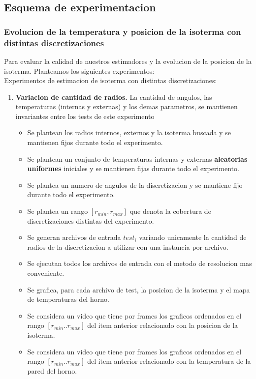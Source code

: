 \subsection{Esquema de experimentacion}
\subsubsection{Evolucion de la temperatura y posicion de la isoterma con distintas discretizaciones}
Para evaluar la calidad de nuestros estimadores y la evolucion de la posicion de la isoterma. Planteamos los siguientes experimentos:\\
Experimentos de estimacion de isoterma con distintas discretizaciones:
\begin{enumerate}
    \item \textbf{Variacion de cantidad de radios.} La cantidad de angulos, las temperaturas (internas y externas) y los demas parametros, se mantienen invariantes entre los tests de este experimento\begin{itemize}
        \item Se plantean los radios internos, externos y la isoterma buscada y se mantienen fijos durante todo el experimento.
        \item Se plantean un conjunto de temperaturas internas y externas \textbf{aleatorias uniformes} iniciales y se mantienen fijas durante todo el experimento.
        \item Se plantea un numero de angulos de la discretizacion y se mantiene fijo durante todo el experimento. 
        \item Se plantea un rango $[r_{min}, r_{max}]$ que denota la cobertura de discretizaciones distintas del experimento.
        \item Se generan archivos de entrada $test_i$ variando unicamente la cantidad de radios de la discretizacion a utilizar con una instancia por archivo.
        \item Se ejecutan todos los archivos de entrada con el metodo de resolucion mas conveniente.
        \item Se grafica, para cada archivo de test, la posicion de la isoterma y el mapa de temperaturas del horno.
        \item Se considera un video que tiene por frames los graficos ordenados en el rango $[r_{min}..r_{max}]$ del item anterior relacionado con la posicion de la isoterma.
        \item Se considera un video que tiene por frames los graficos ordenados en el rango $[r_{min}..r_{max}]$ del item anterior relacionado con la temperatura de la pared del horno.

\end{itemize}
\end{enumerate}
